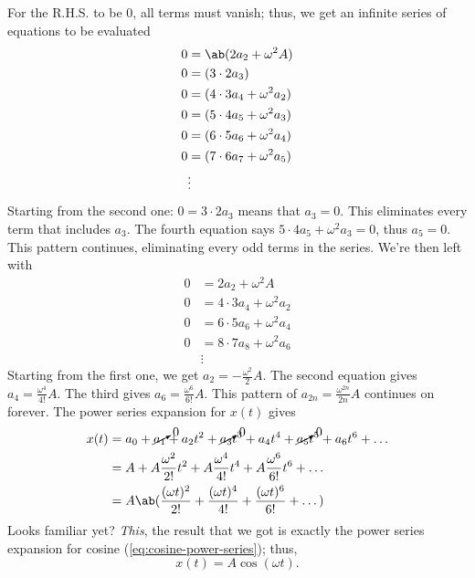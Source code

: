For the R.H.S. to be \(0\), all terms must vanish; thus, we get an infinite series of equations to be evaluated
\begin{equation}
  \begin{aligned}
    0 & = \ab(2a_2 + \omega^2A)       \\
    0 & = (3 \cdot 2a_3)              \\
    0 & = (4\cdot 3a_4 + \omega^2a_2) \\
    0 & = (5\cdot 4a_5 + \omega^2a_3) \\
    0 & = (6\cdot 5a_6 + \omega^2a_4) \\
    0 & = (7\cdot 6a_7 + \omega^2a_5) \\
      & \vdots
  \end{aligned}
\end{equation}
Starting from the second one: \(0 = 3 \cdot 2a_3\) means that \(a_3 = 0\). This eliminates every term that includes \(a_3\). The fourth equation says \(5\cdot 4a_5 + \omega^2a_3 = 0\), thus \(a_5 = 0\). This pattern continues, eliminating every odd terms in the series. We're then left with
\begin{equation}
  \begin{aligned}
    0 & = 2a_2 + \omega^2A          \\
    0 & = 4\cdot 3a_4 + \omega^2a_2 \\
    0 & = 6\cdot 5a_6 + \omega^2a_4 \\
    0 & = 8\cdot 7a_8 + \omega^2a_6 \\
      & \vdots
  \end{aligned}
\end{equation}
Starting from the first one, we get \(a_2 = -\frac{\omega^2}{2}A\). The second equation gives \(a_4 = \frac{\omega^4}{4!}A\). The third gives \(a_6 = \frac{\omega^6}{6!}A\). This pattern of \(a_{2n} = \frac{\omega^{2n}}{2n}A\) continues on forever. The power series expansion for \(x(t)\) gives
\begin{align}
  x(t) & = a_0 + \cancelto{0}{a_1} + a_2t^2 + \cancelto{0}{a_3}t^3 + a_4t^4 + \cancelto{0}{a_5}t^5 + a_6t^6 + \dots \\
       & = A + A\frac{\omega^{2}}{2!}t^2 + A\frac{\omega^{4}}{4!}t^4 + A\frac{\omega^{6}}{6!}t^6 + \dots            \\
       & = A\ab(\frac{(\omega t)^2}{2!} + \frac{(\omega t)^4}{4!} + \frac{(\omega t)^6}{6!} + \dots)
\end{align}
Looks familiar yet? \emph{This}, the result that we got is exactly the power series expansion for cosine (\cref{eq:cosine-power-series}); thus,
\begin{equation}
  x(t) = A\cos(\omega t).
\end{equation}

